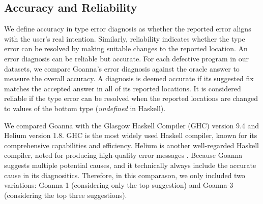 \documentclass[pdflatex,sn-mathphys-num]{sn-jnl}%
\begin{document}
\subsection{Accuracy and Reliability} \label{sub:eval-accuracy}

We define accuracy in type error diagnosis as whether the reported error aligns with the user's real intention. Similarly, reliability indicates whether the type error can be resolved by making suitable changes to the reported location. An error diagnosis can be reliable but accurate. For each defective program in our datasets, we compare Goanna's error diagnosis against the oracle answer to measure the overall accuracy. A diagnosis is deemed accurate if its suggested fix matches the accepted answer in all of its reported locations. It is considered reliable if the type error can be resolved when the reported locations are changed to values of the bottom type (\textit{undefined} in Haskell).

We compared Goanna with the Glasgow Haskell Compiler (GHC) version 9.4 \cite{Gamari_undated-zu} and Helium \cite{Hage2023-kk} version 1.8. GHC is the most widely used Haskell compiler, known for its comprehensive capabilities and efficiency. Helium is another well-regarded Haskell compiler, noted for producing high-quality error messages \cite{Heeren2003-kd}. Because Goanna suggests multiple potential causes, and it technically always include the accurate cause in its diagnositics. Therefore, in this comparason, we only included two variations: Goanna-1 (considering only the top suggestion) and Goanna-3 (considering the top three suggestions).
\end{document}
